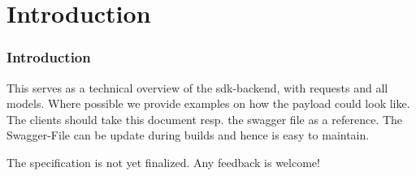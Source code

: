 \part{Introduction}
\section{Introduction}
This serves as a technical overview of the sdk-backend, with requests and all models. Where possible we provide examples on how the payload could look like. The clients should take this document resp. the swagger file as a reference. The Swagger-File can be update during builds and hence is easy to maintain.

The specification is not yet finalized. Any feedback is welcome!